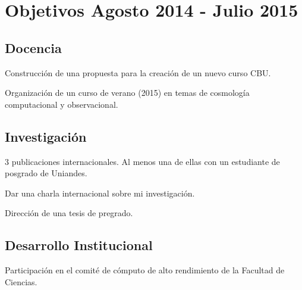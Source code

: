 \documentclass{article}
\begin{document}
\section{Objetivos Agosto 2014 - Julio 2015}


\subsection{Docencia}
Construcci\'on de una propuesta para la creaci\'on de un nuevo curso
CBU. 

Organizaci\'on de un curso de verano (2015) en temas de cosmolog\'ia
computacional y observacional.


\subsection{Investigaci\'on}
3 publicaciones internacionales. Al menos una de ellas con un
estudiante de posgrado de Uniandes.

Dar una charla internacional sobre mi investigaci\'on.

Direcci\'on de una tesis de pregrado.

\subsection{Desarrollo Institucional}
Participaci\'on en el comit\'e  de c\'omputo de alto rendimiento de la
Facultad de Ciencias.
\end{document}
